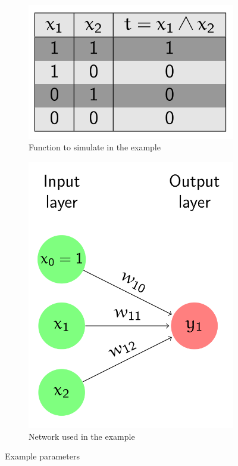 \documentclass[11pt]{article}
\begin{document}
\begin{figure}[tbh!]
    \centering
    \begin{subfigure}{0.45\linewidth}
        \includegraphics[keepaspectratio,width=\linewidth]{Pictures/AND_logic_function}
        \caption{Function to simulate in the example}
    \end{subfigure}
    \begin{subfigure}{0.45\linewidth}
        \includegraphics[keepaspectratio,width=\linewidth]{Pictures/example_network}
        \caption{Network used in the example}
    \end{subfigure}
    \caption{Example parameters}
    \label{fig:exampleparameters}
\end{figure}
\end{document}
